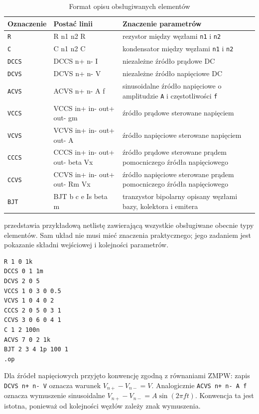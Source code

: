 \begin{table}[H]
\centering
\caption{Format opisu obsługiwanych elementów}
\label{tab:format-elementow}
\begin{tabularx}{\textwidth}{@{}l>{\ttfamily\small}lX@{}}
\toprule
Oznaczenie & Postać linii & Znaczenie parametrów \\
\midrule
\texttt{R} & R n1 n2 R & rezystor między węzłami \texttt{n1} i \texttt{n2} \\
\texttt{C} & C n1 n2 C & kondensator między węzłami \texttt{n1} i \texttt{n2} \\
\texttt{DCCS} & DCCS n+ n- I & niezależne źródło prądowe DC \\
\texttt{DCVS} & DCVS n+ n- V & niezależne źródło napięciowe DC \\
\texttt{ACVS} & ACVS n+ n- A f & sinusoidalne źródło napięciowe o amplitudzie \texttt{A} i częstotliwości \texttt{f} \\
\texttt{VCCS} & VCCS in+ in- out+ out- gm & źródło prądowe sterowane napięciem \\
\texttt{VCVS} & VCVS in+ in- out+ out- A & źródło napięciowe sterowane napięciem \\
\texttt{CCCS} & CCCS in+ in- out+ out- beta Vx & źródło prądowe sterowane prądem pomocniczego źródła napięciowego \\
\texttt{CCVS} & CCVS in+ in- out+ out- Rm Vx & źródło napięciowe sterowane prądem pomocniczego źródła napięciowego \\
\texttt{BJT} & BJT b c e Is beta m & tranzystor bipolarny opisany węzłami bazy, kolektora i emitera \\
\bottomrule
\end{tabularx}
\end{table}

 przedstawia przykładową netlistę zawierającą wszystkie obsługiwane obecnie typy elementów. Sam układ nie musi mieć znaczenia praktycznego; jego zadaniem jest pokazanie składni wejściowej i kolejności parametrów.

\begin{lstlisting}[language=Netlist,caption={Przykładowy opis obwodu z wszystkimi obsługiwanymi elementami},label={lst:all-elements-netlist}]
R 1 0 1k
DCCS 0 1 1m
DCVS 2 0 5
VCCS 1 0 3 0 0.5
VCVS 1 0 4 0 2
CCCS 2 0 5 0 3 1
CCVS 3 0 6 0 4 1
C 1 2 100n
ACVS 7 0 2 1k
BJT 2 3 4 1p 100 1
.op
\end{lstlisting}

Dla źródeł napięciowych przyjęto konwencję zgodną z równaniami ZMPW: zapis \texttt{DCVS n+ n- V} oznacza warunek \(V_{n+} - V_{n-} = V\). Analogicznie \texttt{ACVS n+ n- A f} oznacza wymuszenie sinusoidalne \(V_{n+} - V_{n-} = A\sin(2\pi f t)\). Konwencja ta jest istotna, ponieważ od kolejności węzłów zależy znak wymuszenia.

